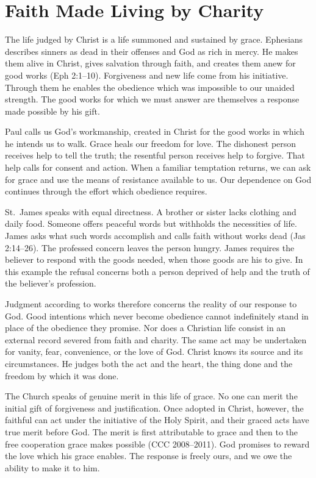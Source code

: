 \section{Faith Made Living by Charity}

The life judged by Christ is a life summoned and sustained by grace. Ephesians describes sinners as dead in their offenses and God as rich in mercy. He makes them alive in Christ, gives salvation through faith, and creates them anew for good works (Eph 2:1--10). Forgiveness and new life come from his initiative. Through them he enables the obedience which was impossible to our unaided strength. The good works for which we must answer are themselves a response made possible by his gift.

Paul calls us God's workmanship, created in Christ for the good works in which he intends us to walk. Grace heals our freedom for love. The dishonest person receives help to tell the truth; the resentful person receives help to forgive. That help calls for consent and action. When a familiar temptation returns, we can ask for grace and use the means of resistance available to us. Our dependence on God continues through the effort which obedience requires.

St.~James speaks with equal directness. A brother or sister lacks clothing and daily food. Someone offers peaceful words but withholds the necessities of life. James asks what such words accomplish and calls faith without works dead (Jas 2:14--26). The professed concern leaves the person hungry. James requires the believer to respond with the goods needed, when those goods are his to give. In this example the refusal concerns both a person deprived of help and the truth of the believer's profession.

Judgment according to works therefore concerns the reality of our response to God. Good intentions which never become obedience cannot indefinitely stand in place of the obedience they promise. Nor does a Christian life consist in an external record severed from faith and charity. The same act may be undertaken for vanity, fear, convenience, or the love of God. Christ knows its source and its circumstances. He judges both the act and the heart, the thing done and the freedom by which it was done.

The Church speaks of genuine merit in this life of grace. No one can merit the initial gift of forgiveness and justification. Once adopted in Christ, however, the faithful can act under the initiative of the Holy Spirit, and their graced acts have true merit before God. The merit is first attributable to grace and then to the free cooperation grace makes possible (CCC 2008--2011). God promises to reward the love which his grace enables. The response is freely ours, and we owe the ability to make it to him.

